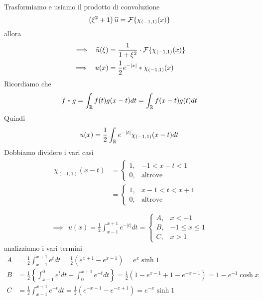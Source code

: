 Trasformiamo e usiamo il prodotto di convoluzione
\begin{equation*}
\left(\xi^{2} + 1\right)\widehat{u} = \mathcal{F} \{\chi_{(- 1, 1)}(x)\}
\end{equation*}
allora
\begin{align*}
\implies \ \ \widehat{u}(\xi) & = \frac{1}{1 + \xi^{2}} \cdot \mathcal{F} \{\chi_{(- 1, 1)}(x)\}\\
\implies \ \ u(x) & = \frac{1}{2} e^{- | x|} *\chi_{(- 1, 1)}(x)
\end{align*}
Ricordiamo che
\begin{equation*}
f*g = \int_{\mathbb{R}} f(t) g(x - t) dt = \int_{\mathbb{R}} f(x - t) g(t) dt
\end{equation*}
Quindi
\begin{equation*}
u(x) = \frac{1}{2}\int_{\mathbb{R}} e^{- | t|} \chi_{(- 1, 1)}(x - t) dt
\end{equation*}
Dobbiamo dividere i vari casi
\begin{gather*}
\begin{aligned}
\chi_{(- 1, 1)}(x - t) & = 
\begin{cases}
1, & - 1 < x - t < 1\\
0, & \text{altrove}
\end{cases}\\
 & = 
 \begin{cases}
1, & x - 1 < t < x + 1\\
0, & \text{altrove}
\end{cases}
\end{aligned}\\
\\
\implies \ \ u(x) = \frac{1}{2}\int^{x + 1}_{x - 1} e^{- | t|} dt = 
\begin{cases}
A, & x < - 1\\
B, & - 1 \leq x \leq 1\\
C, & x > 1
\end{cases}
\end{gather*}
analizziamo i vari termini
\begin{align*}
A & = \frac{1}{2}\int^{x + 1}_{x - 1} e^{t} dt = \frac{1}{2}\left(e^{x + 1} - e^{x - 1}\right) = e^{x}\sinh 1\\
B & = \frac{1}{2}\left\{\int^{0}_{x - 1} e^{t} dt + \int^{x + 1}_{0} e^{- t} dt\right\} = \frac{1}{2}\left(1 - e^{x - 1} + 1 - e^{- x - 1}\right) = 1 - e^{- 1}\cosh x\\
C & = \frac{1}{2}\int^{x + 1}_{x - 1} e^{- t} dt = \frac{1}{2}\left(e^{- x - 1} - e^{- x + 1}\right) = e^{- x}\sinh 1
\end{align*}
